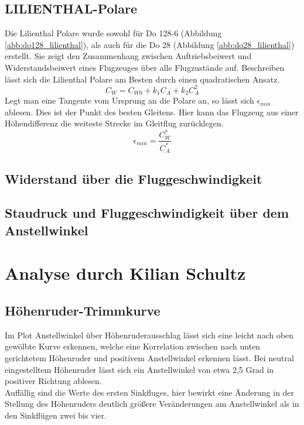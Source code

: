 \subsection{LILIENTHAL-Polare}
Die Lilienthal Polare wurde sowohl für Do 128-6 (Abbildung \ref{abb:do128_lilienthal}), als auch für die Do 28 (Abbildung \ref{abb:do28_lilienthal}) erstellt. Sie zeigt den Zusammenhang zwischen Auftriebsbeiwert und Widerstandsbeiwert eines Flugzeuges über alle Flugzustände auf. 
Beschreiben lässt sich die Lilienthal Polare am Besten durch einen quadratischen Ansatz.
\begin{equation}  \label{eq:theorie_cw}
C_W = C_{W0} + k_1 C_A + k_2 C_A^2
\end{equation}
Legt man eine Tangente vom Ursprung an die Polare an, so lässt sich $\epsilon_{min}$ ablesen. Dies ist der Punkt des besten Gleitens. Hier kann das Flugzeug aus einer Höhendifferenz die weiteste Strecke im Gleitflug zurücklegen. 
\begin{equation}
\epsilon_{min}=\frac{C_W^*}{C_A^*}
\end{equation}
\subsection{Widerstand über die Fluggeschwindigkeit}
\subsection{Staudruck und Fluggeschwindigkeit über dem Anstellwinkel}
\newpage

\section{Analyse durch Kilian Schultz}
\subsection{Höhenruder-Trimmkurve}
Im Plot Anstellwinkel über Höhenruderausschlag lässt sich eine leicht nach oben gewölbte Kurve erkennen, welche eine Korrelation zwischen nach unten gerichtetem Höhenruder und positivem Anstellwinkel erkennen lässt. Bei neutral eingestelltem Höhenruder lässt sich ein Anstellwinkel von etwa 2,5 Grad in positiver Richtung ablesen.\\
Auffällig sind die Werte des ersten Sinkfluges, hier bewirkt eine Änderung in der Stellung des Höhenruders deutlich größere Veränderungen am Anstellwinkel als in den Sinkflügen zwei bis vier.\\\\	

